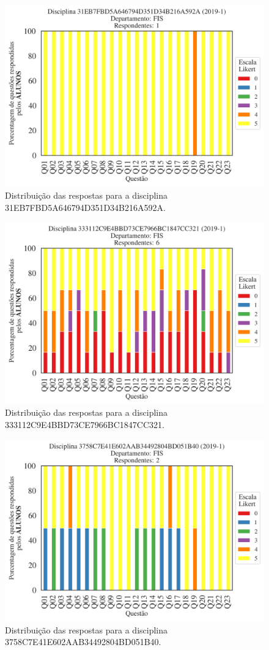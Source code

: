 \documentclass[a4paper,10pt]{article}
\begin{document}
\begin{figure}[h]
\centering
\includegraphics[width=0.485\linewidth]{analise_disciplina_departamento_FIS_ALUNO_TURMA_31EB7FBD5A646794D351D34B216A592A.png}
\caption{\label{fig:analise_geral_departamento}                Distribuição das respostas para a disciplina 31EB7FBD5A646794D351D34B216A592A.}
\end{figure}
\begin{figure}[h]
\centering
\includegraphics[width=0.485\linewidth]{analise_disciplina_departamento_FIS_ALUNO_TURMA_333112C9E4BBD73CE7966BC1847CC321.png}
\caption{\label{fig:analise_geral_departamento}                Distribuição das respostas para a disciplina 333112C9E4BBD73CE7966BC1847CC321.}
\end{figure}
\begin{figure}[h]
\centering
\includegraphics[width=0.485\linewidth]{analise_disciplina_departamento_FIS_ALUNO_TURMA_3758C7E41E602AAB34492804BD051B40.png}
\caption{\label{fig:analise_geral_departamento}                Distribuição das respostas para a disciplina 3758C7E41E602AAB34492804BD051B40.}
\end{figure}
\end{document}
